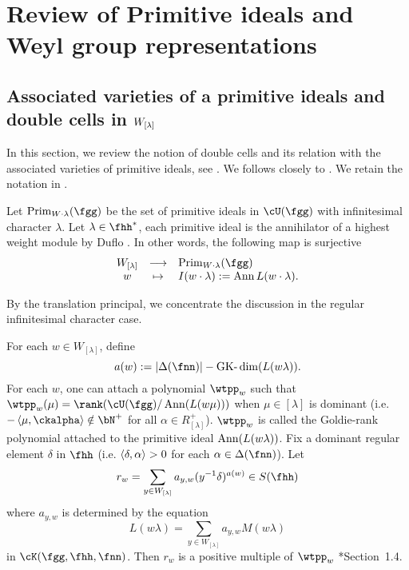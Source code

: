 \documentclass[counting_main.tex]{subfiles}
\begin{document}
\section{Review of Primitive ideals and Weyl group representations}

\subsection{Associated varieties of a primitive ideals and double cells in
  $W_{{[\lambda]}}$}
In this section, we review the notion of double cells and its relation with the
associated varieties of primitive ideals, see \cite{BV2,J.av}. We follows
closely to \cite{BV2}. We retain the notation in .

Let $\Prim_{W\cdot \lambda}(\fgg)$ be the set of primitive ideals in $\cU(\fgg)$
with infinitesimal character $\lambda$. Let $\lambda \in \fhh^{*}$, each
primitive ideal is the annihilator of a highest weight module by Duflo
\cite{Du77}. In other words, the following map is surjective
\[
  \begin{array}{ccl}
    \WLam &\longrightarrow &  \Prim_{W\cdot \lambda}(\fgg)\\
    w & \mapsto & I(w\cdot \lambda) := \Ann L(w\cdot \lambda).
  \end{array}
\]




By the translation principal, we concentrate the discussion in the regular
infinitesimal character case.


For each $w\in W_{[\lambda]}$, define
\[
  a(w) := \abs{\WT{\fnn}} - \GKdim(L(w\lambda)).
\]
 For each $w$, one can attach a
polynomial $\wtpp_{w}$ such that
$\wtpp_{w}(\mu) = \rank(\cU(\fgg)/\Ann(L(w\mu)))$ when $\mu\in [\lambda]$ is
dominant (i.e. $-\inn{\mu}{\ckalpha}\notin \bN^{+}$ for all
$\alpha\in R^{+}_{[\lambda]}$). $\wtpp_{w}$ is called the Goldie-rank polynomial
attached to the primitive ideal $\operatorname{Ann}(L(w\lambda))$. Fix a dominant regular
element $\delta$ in $\fhh$ (i.e. $\inn{\delta}{\alpha}>0$ for each
$\alpha\in \WT{\fnn}$). Let
\[
  r_{w} = \sum_{y\in W_{[\lambda]}} a_{y,w} (y^{-1}\delta)^{a(w)} \in S(\fhh)
\]
where $a_{y,w}$ is determined by the equation
\[
  L(w\lambda) = \sum_{y\in W_{[\lambda]}} a_{y,w} M(w\lambda)
\]
in $\Grt(\fgg,\fhh,\fnn)$. Then $r_{w}$ is a positive multiple of $\wtpp_{w}$
\cite{J2}*{Section~1.4}.
\end{document}
